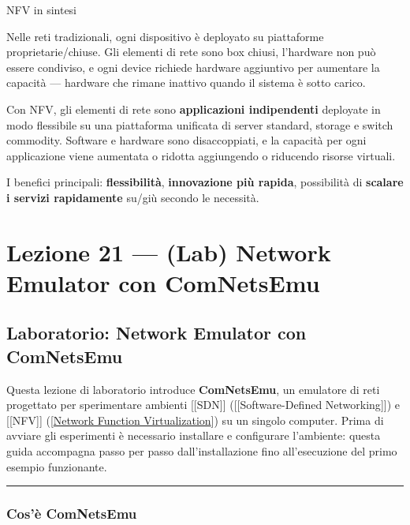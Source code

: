 \documentclass[
  italian,
  openany]{book}
\begin{document}
\begin{calloutnote}{NFV in sintesi}

Nelle reti tradizionali, ogni dispositivo è deployato su piattaforme
proprietarie/chiuse. Gli elementi di rete sono box chiusi, l'hardware
non può essere condiviso, e ogni device richiede hardware aggiuntivo per
aumentare la capacità --- hardware che rimane inattivo quando il sistema
è sotto carico.

Con NFV, gli elementi di rete sono \textbf{applicazioni indipendenti}
deployate in modo flessibile su una piattaforma unificata di server
standard, storage e switch commodity. Software e hardware sono
disaccoppiati, e la capacità per ogni applicazione viene aumentata o
ridotta aggiungendo o riducendo risorse virtuali.

I benefici principali: \textbf{flessibilità}, \textbf{innovazione più
rapida}, possibilità di \textbf{scalare i servizi rapidamente} su/giù
secondo le necessità.

\end{calloutnote}

\newpage

\chapter{Lezione 21 --- (Lab) Network Emulator con
ComNetsEmu}\label{lezione-21-lab-network-emulator-con-comnetsemu}

\section{Laboratorio: Network Emulator con
ComNetsEmu}\label{laboratorio-network-emulator-con-comnetsemu}

Questa lezione di laboratorio introduce \textbf{ComNetsEmu}, un
emulatore di reti progettato per sperimentare ambienti {[}{[}SDN{]}{]}
({[}{[}Software-Defined Networking{]}{]}) e {[}{[}NFV{]}{]}
({[}\hyperref[network-function-virtualization]{Network Function
Virtualization}{]}) su un singolo computer. Prima di avviare gli
esperimenti è necessario installare e configurare l'ambiente: questa
guida accompagna passo per passo dall'installazione fino all'esecuzione
del primo esempio funzionante.

\begin{center}\rule{0.5\linewidth}{0.5pt}\end{center}

\subsection{Cos'è ComNetsEmu}\label{cosuxe8-comnetsemu}
\end{document}
